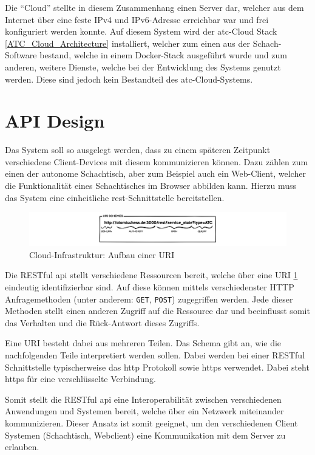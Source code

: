 Die ``Cloud'' stellte in diesem Zusammenhang einen Server dar, welcher
aus dem Internet über eine feste IPv4 und IPv6-Adresse erreichbar war
und frei konfiguriert werden konnte. Auf diesem System wird der
\gls{atc}-Cloud Stack \ref{ATC_Cloud_Architecture} installiert, welcher
zum einen aus der Schach-Software bestand, welche in einem Docker-Stack
ausgeführt wurde und zum anderen, weitere Dienste, welche bei der
Entwicklung des Systems genutzt werden. Diese sind jedoch kein
Bestandteil des \gls{atc}-Cloud-Systems.

\hypertarget{api-design}{%
\section{API Design}\label{api-design}}

Das System soll so ausgelegt werden, dass zu einem späteren Zeitpunkt
verschiedene Client-Devices mit diesem kommunizieren können. Dazu zählen
zum einen der autonome Schachtisch, aber zum Beispiel auch ein
Web-Client, welcher die Funktionalität eines Schachtisches im Browser
abbilden kann. Hierzu muss das System eine einheitliche
\gls{rest}-Schnittstelle bereitstellen.

\begin{figure}
\centering
\includegraphics{images/ATC_URI_SCHEMES.png}
\caption{Cloud-Infrastruktur: Aufbau einer URI \label{ATC_URI_SCHEMES}}
\end{figure}

Die RESTful \gls{api} stellt verschiedene Ressourcen bereit, welche über
eine URI \ref{ATC_URI_SCHEMES} eindeutig identifizierbar sind. Auf diese
können mittels verschiedenster HTTP Anfragemethoden (unter anderem:
\passthrough{\lstinline!GET!}, \passthrough{\lstinline!POST!})
zugegriffen werden. Jede dieser Methoden stellt einen anderen Zugriff
auf die Ressource dar und beeinflusst somit das Verhalten und die
Rück-Antwort dieses Zugriffs.

Eine URI besteht dabei aus mehreren Teilen. Das Schema gibt an, wie die
nachfolgenden Teile interpretiert werden sollen. Dabei werden bei einer
RESTful Schnittstelle typischerweise das \gls{http} Protokoll sowie
\gls{https} verwendet. Dabei steht \gls{https} für eine verschlüsselte
Verbindung.

Somit stellt die RESTful \gls{api} eine Interoperabilität zwischen
verschiedenen Anwendungen und Systemen bereit, welche über ein Netzwerk
miteinander kommunizieren. Dieser Ansatz ist somit geeignet, um den
verschiedenen Client Systemen (Schachtisch, Webclient) eine
Kommunikation mit dem Server zu erlauben.

